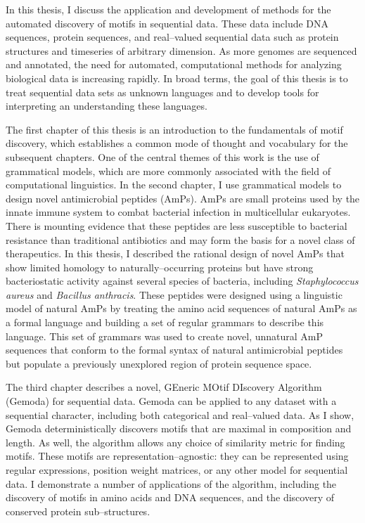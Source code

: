 %
%
%
In this thesis, I discuss the application and development of methods
for the automated discovery of motifs in sequential data.  These data
include DNA sequences, protein sequences, and real--valued
sequential data such as protein structures and timeseries of
arbitrary dimension. As more genomes are sequenced and annotated,
the need for automated, computational methods for analyzing
biological data is increasing rapidly.  In broad terms, the goal of
this thesis is to treat sequential data sets as unknown languages
and to develop tools for interpreting an understanding these
languages.

The first chapter of this thesis is an introduction to the
fundamentals of motif discovery, which establishes a common mode of
thought and vocabulary for the subsequent chapters.  One of the
central themes of this work is the use of grammatical models,
which are more commonly associated with the field of computational
linguistics.  In the second chapter, I use grammatical models to
design novel antimicrobial peptides (AmPs). AmPs are small proteins
used by the innate immune system to combat bacterial infection in
multicellular eukaryotes. There is mounting evidence that these
peptides are less susceptible to bacterial resistance than
traditional antibiotics and may form the basis for a novel class of
therapeutics. In this thesis, I described the rational design of
novel AmPs that show limited homology to naturally--occurring
proteins but have strong bacteriostatic activity against several
species of bacteria, including \emph{Staphylococcus aureus} and
\emph{Bacillus anthracis}. These peptides were designed using a
linguistic model of natural AmPs by treating the amino acid
sequences of natural AmPs as a formal language and building a set of
regular grammars to describe this language. This set of grammars was
used to create novel, unnatural AmP sequences that conform to the
formal syntax of natural antimicrobial peptides but populate a
previously unexplored region of protein sequence space.

The third chapter describes a novel, GEneric MOtif DIscovery
Algorithm (Gemoda) for sequential data. Gemoda can be applied to any
dataset with a sequential character, including both categorical and
real--valued data.  As I show, Gemoda deterministically discovers
motifs that are maximal in composition and length.  As well, the
algorithm allows any choice of similarity metric for finding motifs.
These motifs are representation--agnostic: they can be represented
using regular expressions, position weight matrices, or 
any other model for sequential data. I demonstrate a
number of applications of the algorithm, including the discovery of
motifs in amino acids and DNA sequences, and the discovery of
conserved protein sub--structures.

